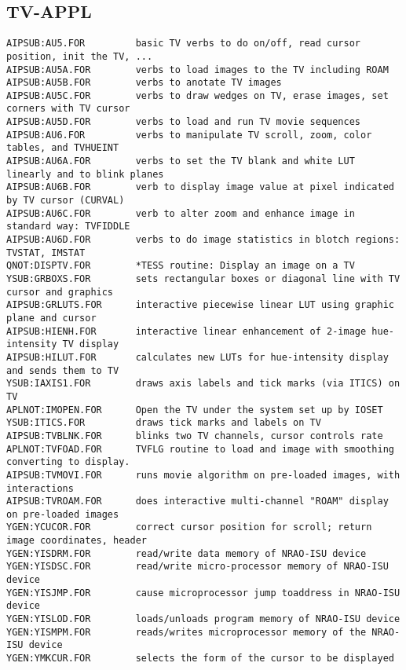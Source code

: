 \subsection{TV-APPL}
\begin{verbatim}
AIPSUB:AU5.FOR         basic TV verbs to do on/off, read cursor position, init the TV, ...
AIPSUB:AU5A.FOR        verbs to load images to the TV including ROAM
AIPSUB:AU5B.FOR        verbs to anotate TV images
AIPSUB:AU5C.FOR        verbs to draw wedges on TV, erase images, set corners with TV cursor
AIPSUB:AU5D.FOR        verbs to load and run TV movie sequences
AIPSUB:AU6.FOR         verbs to manipulate TV scroll, zoom, color tables, and TVHUEINT
AIPSUB:AU6A.FOR        verbs to set the TV blank and white LUT linearly and to blink planes
AIPSUB:AU6B.FOR        verb to display image value at pixel indicated by TV cursor (CURVAL)
AIPSUB:AU6C.FOR        verb to alter zoom and enhance image in standard way: TVFIDDLE
AIPSUB:AU6D.FOR        verbs to do image statistics in blotch regions: TVSTAT, IMSTAT
QNOT:DISPTV.FOR        *TESS routine: Display an image on a TV
YSUB:GRBOXS.FOR        sets rectangular boxes or diagonal line with TV cursor and graphics
AIPSUB:GRLUTS.FOR      interactive piecewise linear LUT using graphic plane and cursor
AIPSUB:HIENH.FOR       interactive linear enhancement of 2-image hue-intensity TV display
AIPSUB:HILUT.FOR       calculates new LUTs for hue-intensity display and sends them to TV
YSUB:IAXIS1.FOR        draws axis labels and tick marks (via ITICS) on TV
APLNOT:IMOPEN.FOR      Open the TV under the system set up by IOSET
YSUB:ITICS.FOR         draws tick marks and labels on TV
AIPSUB:TVBLNK.FOR      blinks two TV channels, cursor controls rate
APLNOT:TVFOAD.FOR      TVFLG routine to load and image with smoothing converting to display.
AIPSUB:TVMOVI.FOR      runs movie algorithm on pre-loaded images, with interactions
AIPSUB:TVROAM.FOR      does interactive multi-channel "ROAM" display on pre-loaded images
YGEN:YCUCOR.FOR        correct cursor position for scroll; return image coordinates, header
YGEN:YISDRM.FOR        read/write data memory of NRAO-ISU device
YGEN:YISDSC.FOR        read/write micro-processor memory of NRAO-ISU device
YGEN:YISJMP.FOR        cause microprocessor jump toaddress in NRAO-ISU device
YGEN:YISLOD.FOR        loads/unloads program memory of NRAO-ISU device
YGEN:YISMPM.FOR        reads/writes microprocessor memory of the NRAO-ISU device
YGEN:YMKCUR.FOR        selects the form of the cursor to be displayed
\end{verbatim}
 
